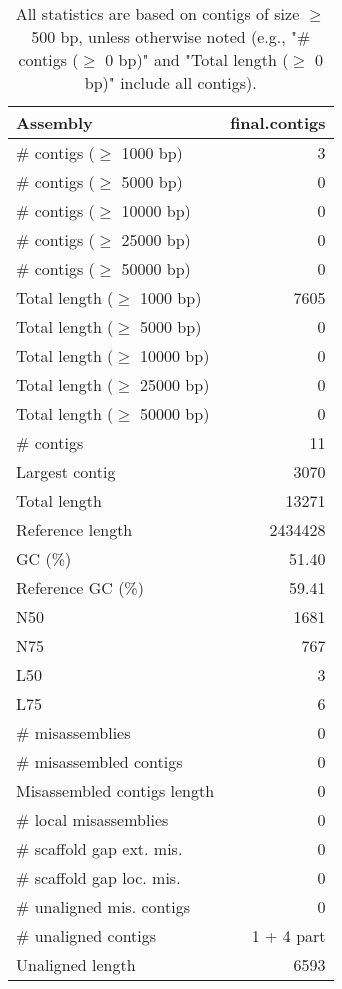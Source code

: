 \documentclass[12pt,a4paper]{article}
\begin{document}
\begin{table}[ht]
\begin{center}
\caption{All statistics are based on contigs of size $\geq$ 500 bp, unless otherwise noted (e.g., "\# contigs ($\geq$ 0 bp)" and "Total length ($\geq$ 0 bp)" include all contigs).}
\begin{tabular}{|l*{1}{|r}|}
\hline
Assembly & final.contigs \\ \hline
\# contigs ($\geq$ 1000 bp) & 3 \\ \hline
\# contigs ($\geq$ 5000 bp) & 0 \\ \hline
\# contigs ($\geq$ 10000 bp) & 0 \\ \hline
\# contigs ($\geq$ 25000 bp) & 0 \\ \hline
\# contigs ($\geq$ 50000 bp) & 0 \\ \hline
Total length ($\geq$ 1000 bp) & 7605 \\ \hline
Total length ($\geq$ 5000 bp) & 0 \\ \hline
Total length ($\geq$ 10000 bp) & 0 \\ \hline
Total length ($\geq$ 25000 bp) & 0 \\ \hline
Total length ($\geq$ 50000 bp) & 0 \\ \hline
\# contigs & 11 \\ \hline
Largest contig & 3070 \\ \hline
Total length & 13271 \\ \hline
Reference length & 2434428 \\ \hline
GC (\%) & 51.40 \\ \hline
Reference GC (\%) & 59.41 \\ \hline
N50 & 1681 \\ \hline
N75 & 767 \\ \hline
L50 & 3 \\ \hline
L75 & 6 \\ \hline
\# misassemblies & 0 \\ \hline
\# misassembled contigs & 0 \\ \hline
Misassembled contigs length & 0 \\ \hline
\# local misassemblies & 0 \\ \hline
\# scaffold gap ext. mis. & 0 \\ \hline
\# scaffold gap loc. mis. & 0 \\ \hline
\# unaligned mis. contigs & 0 \\ \hline
\# unaligned contigs & 1 + 4 part \\ \hline
Unaligned length & 6593 \\ \hline

\end{tabular}
\end{center}
\end{table}
\end{document}
